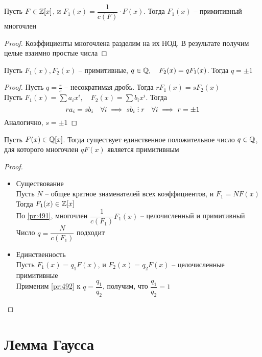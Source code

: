 \begin{props}
	\item \label{pr:491} Пусть $F \in \mathbb{Z}[x]$, и $F_1(x) = \dfrac1{c(F)} \cdot F(x)$. Тогда $F_1(x)$ -- примитивный многочлен
	\begin{proof}
		Коэффициенты многочлена разделим на их НОД. В результате получим целые взаимно простые числа
	\end{proof}
	\item \label{pr:492} Пусть $F_1(x), F_2(x)$ -- примитивные, $q \in \mathbb{Q}, \quad F_2(x) = qF_1(x)$. Тогда $q = \pm1$
	\begin{proof}
		Пусть $q = \frac{r}s$ -- несократимая дробь. Тогда $rF_1(x) = sF_2(x)$ \\
		Пусть $F_1(x) = \sum a_ix^i, \quad F_2(x) = \sum b_ix^i$. Тогда
		$$ ra_i = sb_i \quad \forall i \implies sb_i \divby r \quad \forall i \implies r = \pm 1 $$
		Аналогично, $s = \pm 1$
	\end{proof}
	\item Пусть $F(x) \in \mathbb{Q}[x]$. Тогда существует единственное положительное число $q \in \mathbb{Q}$, для которого многочлен $qF(x)$ является примитивным
	\begin{proof}
		\hfill
		\begin{itemize}
			\item Существование \\
			Пусть $N$ -- общее кратное знаменателей всех коэффициентов, и $F_1 = NF(x)$ \\
			Тогда $F_1(x) \in \mathbb{Z}[x]$ \\
			По \eqref{pr:491}, многочлен $\dfrac1{c(F_1)}F_1(x)$ -- целочисленный и примитивный \\
			Число $q = \dfrac{N}{c(F_1)}$ подходит
			\item Единственность \\
			Пусть $F_1(x) = q_1F(x)$, и $F_2(x) = q_2F(x)$ -- целочисленные примитивные \\
			Применим \eqref{pr:492} к $q = \dfrac{q_1}{q_2}$, получим, что $\dfrac{q_1}{q_2} = 1$
		\end{itemize}
	\end{proof}
\end{props}

\section{Лемма Гаусса}

